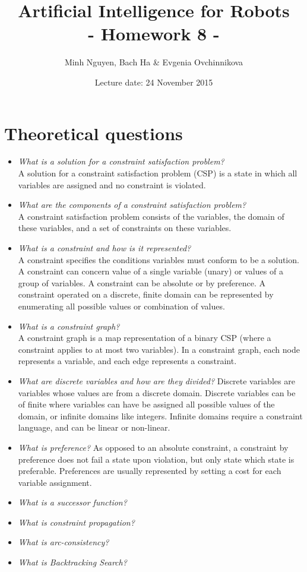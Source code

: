 \documentclass[a4paper, 12pt]{article}
\title{Artificial Intelligence for Robots \\
				- Homework 8 -}
\author{Minh Nguyen, Bach Ha \& Evgenia Ovchinnikova}
\date{Lecture date: 24 November 2015}
\begin{document}
\maketitle

\section{Theoretical questions}

    \begin{itemize}
        \item \emph{What is a solution for a constraint satisfaction problem?}\\
            A solution for a constraint satisfaction problem (CSP) is a state in
            which all variables are assigned and no constraint is violated.
        \item \emph{What are the components of a constraint satisfaction problem?}\\
            A constraint satisfaction problem consists of the variables, the
            domain of these variables, and a set of constraints on these variables.
        \item \emph{What is a constraint and how is it represented?}\\
            A constraint specifies the conditions variables must conform to be a
            solution. A constraint can concern value of a single variable (unary)
            or values of a group of variables. A constraint can be absolute or
            by preference. A constraint operated on a discrete, finite domain
            can be represented by enumerating all possible values or combination
            of values.
        \item \emph{What is a constraint graph?}\\
            A constraint graph is a map representation of a binary CSP (where a
            constraint applies to at most two variables). In a constraint graph,
            each node represents a variable, and each edge represents a constraint.
        \item \emph{What are discrete variables and how are they divided?}
            Discrete variables are variables whose values are from a discrete
            domain. Discrete variables can be of finite where variables can have
            be assigned all possible values of the domain, or infinite domains
            like integers. Infinite domains require a constraint language, and
            can be linear or non-linear.
        \item \emph{What is preference?}
            As opposed to an absolute constraint, a constraint by preference does
            not fail a state upon violation, but only state which state is
            preferable. Preferences are usually represented by setting a cost
            for each variable assignment.
        \item \emph{What is a successor function?}
        \item \emph{What is constraint propagation?}
        \item \emph{What is arc-consistency?}
        \item \emph{What is Backtracking Search?}
    \end{itemize}
\end{document}
